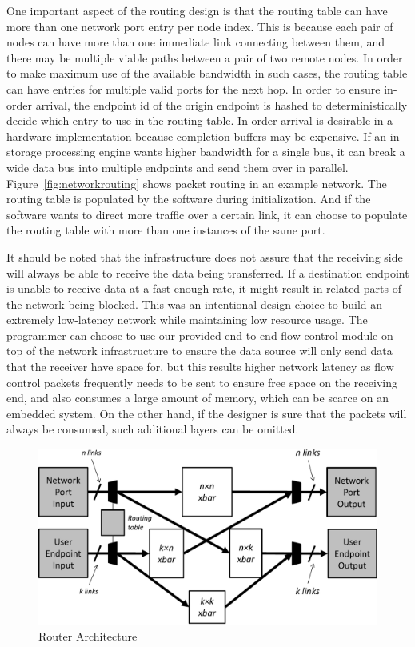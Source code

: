 One important aspect of the routing design is that the routing table can have
more than one network port entry per node index. This is because each pair of
nodes can have more than one immediate link connecting between them, and there may be
multiple viable paths between a pair of two remote nodes. In order to make
maximum use of the available bandwidth in such cases, the routing table can have
entries for multiple valid ports for the next hop. In order to ensure in-order
arrival, the endpoint id of the origin endpoint is hashed to deterministically
decide which entry to use in the routing table. In-order arrival is desirable in
a hardware implementation because completion buffers may be expensive. If an
in-storage processing engine wants higher bandwidth for a single bus, it can
break a wide data bus into multiple endpoints and send them over in parallel.
Figure~\ref{fig:networkrouting} shows packet routing in an example network.
The routing table is populated by the software during initialization. And if the
software wants to direct more traffic over a certain link, it can choose to
populate the routing table with more than one instances of the same port.


It should be noted that the infrastructure does not assure that the receiving
side will always be able to receive the data being transferred. If a destination
endpoint is unable to receive data at a fast enough rate, it might result in
related parts of the network being blocked. This was an intentional design
choice to build an extremely low-latency network while maintaining low resource
usage. The programmer can choose to use our provided end-to-end flow control
module on top of the network infrastructure to ensure the data source will only
send data that the receiver have space for, but this results higher network
latency as flow control packets frequently needs to be sent to ensure free space
on the receiving end, and also consumes a large amount of memory, which can be
scarce on an embedded system.  On the other hand, if the designer is sure that
the packets will always be consumed, such additional layers can be omitted. 

\begin{figure}[h]
	\begin{center}
	\includegraphics[scale=0.4]{figures/network-routing-crop.pdf}
	\caption{Router Architecture}
	\label{fig:networkinterface}
	\end{center}
\end{figure}

